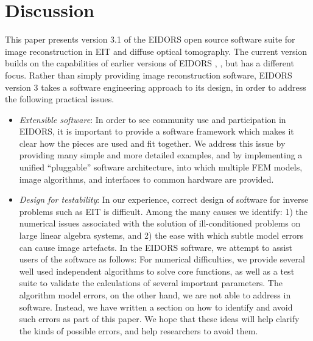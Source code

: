\documentclass[12pt]{iopart}
\begin{document}
\section{
 Discussion
}

This paper presents version 3.1 of the EIDORS
open source software suite for image reconstruction
in EIT and diffuse optical tomography.
The current version builds on the capabilities of
earlier versions of EIDORS \cite{Vauhkonen_etal_2000},
\cite{Polydorides_and_Lionheart_2002}, but
has a different focus. Rather than
simply providing image reconstruction software, 
EIDORS version 3 takes a software engineering
approach to its design, in order to address the
following practical issues.

\begin{itemize}

  \item {\em Extensible software}:
  In order to see community use and participation
  in EIDORS, it is important to provide a 
  software framework which makes it clear how
  the pieces are used and fit together.
  We address this issue by providing many simple
  and more detailed examples, and by implementing
  a unified ``pluggable'' software architecture,
  into which multiple FEM models, image algorithms, and
  interfaces to common hardware are provided.

  \item {\em Design for testability}:
  In our experience, correct design of software for
  inverse problems such as EIT is difficult. Among the
  many causes we identify: 1) the numerical issues associated
  with the solution of ill-conditioned problems on
  large linear algebra systems, and 2) the ease with which
  subtle model errors can cause image artefacts.
  In the EIDORS software, we attempt to assist 
  users of the software as follows:
  For numerical difficulties, we provide several well used independent
  algorithms to solve core functions, as well as a test suite
  to validate the calculations of several important parameters.
  The algorithm model errors, on the other
  hand, we are not able to address in software. Instead, we
  have written a section on how to identify and avoid such
  errors as part of this paper.
  We hope that these ideas will help clarify the kinds of
  possible errors, and help researchers to avoid them.

\end{itemize}
\end{document}
